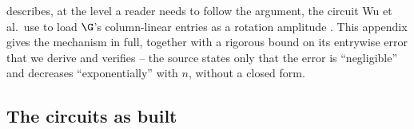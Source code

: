 %

 describes, at the level a reader needs to follow the
argument, the circuit Wu et al.\ use to load $\G$'s column-linear entries as a
rotation amplitude \cite{wu2025pihm}. This appendix gives the mechanism in full,
together with a rigorous bound on its entrywise error that we derive and
verifies -- the source states only that the error is ``negligible'' and
decreases ``exponentially'' with $n$, without a closed form.

\subsection{The circuits as built}
\label{app:published-build}

